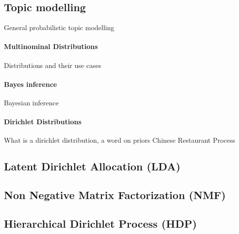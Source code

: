   \subsection{Topic modelling}
    \cite{blei2011introduction, SemanticTopicModels2011, TopicModelsBlei2012, ProbTopicModelsSteyvers2006}
    General probabilistic topic modelling

    \paragraph{Multinominal Distributions}

      Distributions and their use cases

    \paragraph{Bayes inference}

      Bayesian inference

    \paragraph{Dirichlet Distributions}

      What is a dirichlet distribution, a word on priors
      Chinese Restaurant Process \cite{Nothing}

  \subsection{Latent Dirichlet Allocation (LDA)}
    \cite{PLSA2001, LDA2003}

  \subsection{Non Negative Matrix Factorization (NMF)}
    \cite{NMF1999}

  \subsection{Hierarchical Dirichlet Process (HDP)}
    \cite{PLSA2001, LDA2003}

